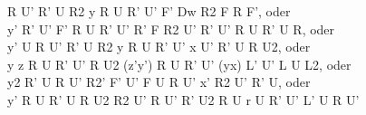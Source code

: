R U' R' U R2 y R U R' U' F' Dw R2 F R F', oder\\
y' R' U' F' R U R' U' R' F R2 U' R' U' R U R' U R, oder\\
y' U R U' R' U R2 y R U R' U' x U' R' U R U2, oder\\
y z R U R' U' R U2 (z'y') R U R' U' (yx) L' U' L U L2, oder\\
y2 R' U R U' R2' F' U' F U R U' x' R2 U' R' U, oder\\
y' R U R' U R U2 R2 U' R U' R' U2 R U r U R' U' L' U R U'\\
